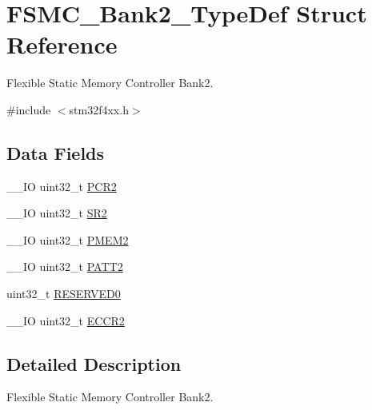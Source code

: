 \hypertarget{struct_f_s_m_c___bank2___type_def}{\section{F\-S\-M\-C\-\_\-\-Bank2\-\_\-\-Type\-Def Struct Reference}
\label{struct_f_s_m_c___bank2___type_def}
}


Flexible Static Memory Controller Bank2.  




{\ttfamily \#include $<$stm32f4xx.\-h$>$}

\subsection*{Data Fields}
\begin{DoxyCompactItemize}
\item 
\-\_\-\-\_\-\-I\-O uint32\-\_\-t \hyperlink{struct_f_s_m_c___bank2___type_def_ab0cb1d704ee64c62ad5be55522a2683a}{P\-C\-R2}
\item 
\-\_\-\-\_\-\-I\-O uint32\-\_\-t \hyperlink{struct_f_s_m_c___bank2___type_def_a89623ee198737b29dc0a803310605a83}{S\-R2}
\item 
\-\_\-\-\_\-\-I\-O uint32\-\_\-t \hyperlink{struct_f_s_m_c___bank2___type_def_a2e5a7a96de68a6612affa6df8c309c3d}{P\-M\-E\-M2}
\item 
\-\_\-\-\_\-\-I\-O uint32\-\_\-t \hyperlink{struct_f_s_m_c___bank2___type_def_a9c1bc909ec5ed32df45444488ea6668b}{P\-A\-T\-T2}
\item 
uint32\-\_\-t \hyperlink{struct_f_s_m_c___bank2___type_def_af86c61a5d38a4fc9cef942a12744486b}{R\-E\-S\-E\-R\-V\-E\-D0}
\item 
\-\_\-\-\_\-\-I\-O uint32\-\_\-t \hyperlink{struct_f_s_m_c___bank2___type_def_a05a47a1664adc7a3db3fa3e83fe883b4}{E\-C\-C\-R2}
\end{DoxyCompactItemize}


\subsection{Detailed Description}
Flexible Static Memory Controller Bank2. 


